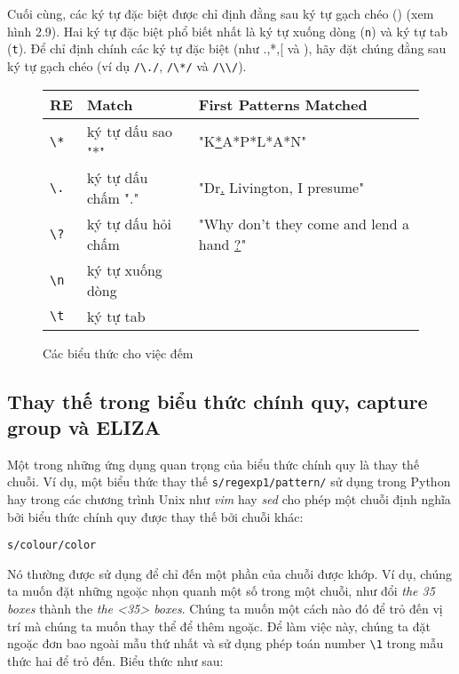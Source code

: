 Cuối cùng, các ký tự đặc biệt được chỉ định đằng sau ký tự gạch chéo () (xem hình 2.9). Hai ký tự đặc biệt phổ biết nhất là ký tự xuống dòng (\texttt{n}) và ký tự tab (\texttt{t}). Để chỉ định chính các ký tự đặc biệt (như .,*,[ và ), hãy đặt chúng đằng sau ký tự gạch chéo (ví dụ \verb|/\./|, \verb|/\*/| và \verb|/\\/|).

\begin{figure}[h]
	\begin{tabular}{ l l l }
	 \hline
	 RE & Match & First Patterns Matched \\
	 \hline
	 \verb|\*| & ký tự dấu sao "*"  & "K\underline{*}A*P*L*A*N"  \\
	 \verb|\.| & ký tự dấu chấm "."  & "Dr\underline{.} Livington, I presume"  \\
	 \verb|\?| & ký tự dấu hỏi chấm & "Why don't they come and lend a hand \underline{?}"  \\
	 \verb|\n| & ký tự xuống dòng  &  \\
	 \verb|\t| & ký tự tab & \\
	 \hline
	\end{tabular}
 \caption{Các biểu thức cho việc đếm}
 \label{table:1}
\end{figure}

\vspace{2em}
\subsection{Thay thế trong biểu thức chính quy, capture group và ELIZA}

Một trong những ứng dụng quan trọng của biểu thức chính quy là thay thế chuỗi. Ví dụ, một biểu thức thay thế \verb|s/regexp1/pattern/| sử dụng trong Python hay trong các chương trình Unix như \textit{vim} hay \textit{sed} cho phép một chuỗi định nghĩa bởi biểu thức chính quy được thay thế bởi chuỗi khác:

\vspace{0.6em}

\noindent \texttt{s/colour/color}

\vspace{0.6em}

Nó thường được sử dụng để chỉ đến một phần của chuỗi được khớp. Ví dụ, chúng ta muốn đặt những ngoặc nhọn quanh một số trong một chuỗi, như đổi \textit{the 35 boxes} thành the \textit{the <35> boxes}. Chúng ta muốn một cách nào đó để trỏ đến vị trí mà chúng ta muốn thay thể để thêm ngoặc. Để làm việc này, chúng ta đặt ngoặc đơn bao ngoài mẫu thứ nhất và sử dụng phép toán number \verb|\1| trong mẫu thức hai để trỏ đến. Biểu thức như sau:

